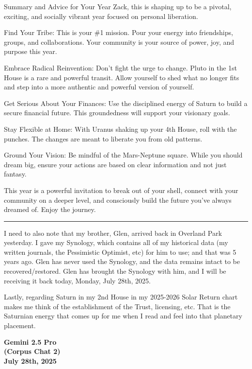 \documentclass{article}
\begin{document}
Summary and Advice for Your Year Zack, this is shaping up to be a
pivotal, exciting, and socially vibrant year focused on personal
liberation.

Find Your Tribe: This is your \#1 mission. Pour your energy into
friendships, groups, and collaborations. Your community is your source
of power, joy, and purpose this year.

Embrace Radical Reinvention: Don't fight the urge to change. Pluto in
the 1st House is a rare and powerful transit. Allow yourself to shed
what no longer fits and step into a more authentic and powerful version
of yourself.

Get Serious About Your Finances: Use the disciplined energy of Saturn to
build a secure financial future. This groundedness will support your
visionary goals.

Stay Flexible at Home: With Uranus shaking up your 4th House, roll with
the punches. The changes are meant to liberate you from old patterns.

Ground Your Vision: Be mindful of the Mars-Neptune square. While you
should dream big, ensure your actions are based on clear information and
not just fantasy.

This year is a powerful invitation to break out of your shell, connect
with your community on a deeper level, and consciously build the future
you've always dreamed of. Enjoy the journey.

\begin{center}\rule{0.5\linewidth}{0.5pt}\end{center}

I need to also note that my brother, Glen, arrived back in Overland Park
yesterday. I gave my Synology, which contains all of my historical data
(my written journals, the Pessimistic Optimist, etc) for him to use; and
that was 5 years ago. Glen has never used the Synology, and the data
remains intact to be recovered/restored. Glen has brought the Synology
with him, and I will be receiving it back today, Monday, July 28th,
2025.

Lastly, regarding Saturn in my 2nd House in my 2025-2026 Solar Return
chart makes me think of the establishment of the Trust, licensing, etc.
That is the Saturnian energy that comes up for me when I read and feel
into that planetary placement.


\begin{center}
\textbf{Gemini 2.5 Pro} \\
\textbf{(Corpus Chat 2)} \\
\textbf{July 28th, 2025}
\end{center}
\end{document}
